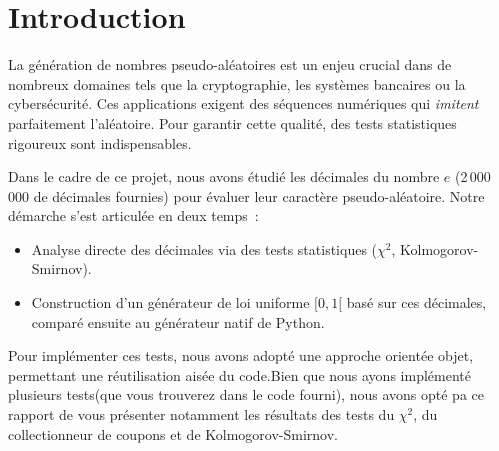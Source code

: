 \section{Introduction}
La génération de nombres pseudo-aléatoires est un enjeu crucial dans de nombreux domaines tels que la cryptographie, les systèmes bancaires ou la cybersécurité. Ces applications exigent des séquences numériques qui \emph{imitent} parfaitement l'aléatoire. Pour garantir cette qualité, des tests statistiques rigoureux sont indispensables.

Dans le cadre de ce projet, nous avons étudié les décimales du nombre $e$ (2\,000\,000 de décimales fournies) pour évaluer leur caractère pseudo-aléatoire. Notre démarche s'est articulée en deux temps~:
\begin{itemize}[leftmargin=*]
    \item Analyse directe des décimales via des tests statistiques ($\chi^2$, Kolmogorov-Smirnov).
    \item Construction d'un générateur de loi uniforme $[0,1[$ basé sur ces décimales, comparé ensuite au générateur natif de Python.
\end{itemize}

Pour implémenter ces tests, nous avons adopté une approche orientée objet, permettant une réutilisation aisée du code.Bien que nous ayons implémenté plusieurs tests(que vous trouverez dans le code fourni), nous avons opté pa ce rapport de vous présenter notamment les résultats des tests du $\chi^2$, du collectionneur de coupons et de Kolmogorov-Smirnov.

\clearpage